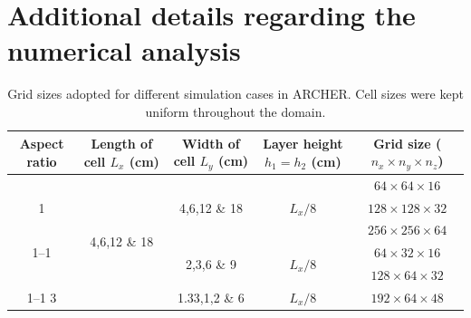 \documentclass[aps,prfluids,reprint,superscriptaddress]{revtex4-2}
\begin{document}
\appendix
\section{Additional details regarding the numerical analysis}
\label{appD}

\begin{table}%
	\caption{Grid sizes adopted for different simulation cases in ARCHER. Cell sizes were kept uniform throughout the domain.}
	\label{tab:grid_info}
	\begin{ruledtabular}
		\begin{tabular}{ccccc} %
	Aspect ratio & Length of cell $L_x$ (cm) & Width of cell $L_y$ (cm) & Layer height $h_1=h_2$ (cm) & Grid size ($n_x \times n_y \times n_z$) \\
		\hline
		\multirow{3}{*}{1} 
		& \multirow{6}{*}{4,6,12 \& 18}
		& \multirow{3}{*}{4,6,12 \& 18}
		& \multirow{3}{*}{$L_x/8$}
		& $64\times 64 \times 16$ 
		\\
		&  & &
		&  $128\times 128 \times 32$ 
		\\
		&  & &
		&  $256\times 256 \times 64$ 
		\\ \cline{1--1}\cline{3-5}
		\multirow{2}{*}{2}  
		&
		& \multirow{2}{*}{2,3,6 \& 9}
		& \multirow{2}{*}{$L_x/8$} 
		& $64\times 32 \times 16$ 
		\\
		&  &  & 
		& $128\times 64 \times 32$ 
		\\ \cline{1--1}\cline{3-5}
		3 
		&
		& \multirow{1}{*}{1.33,1,2 \& 6}
		& \multirow{1}{*}{$L_x/8$}
		& $192\times 64 \times 48$ 
		\end{tabular}
	\end{ruledtabular}
\end{table}
\end{document}
